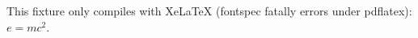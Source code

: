 \documentclass{article}
\begin{document}
This fixture only compiles with XeLaTeX (fontspec fatally errors under
pdflatex): $e=mc^2$.
\end{document}
